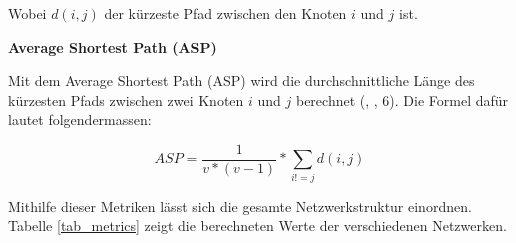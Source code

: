 Wobei $d(i,j)$ der kürzeste Pfad zwischen den Knoten $i$ und $j$ ist.

\textbf{Average Shortest Path (ASP)}

Mit dem Average Shortest Path (ASP) wird die durchschnittliche Länge des kürzesten Pfads zwischen zwei Knoten $i$ und $j$ berechnet (\citeauthor{gao_link_2015}, \citeyear{gao_link_2015}, 6).
Die Formel dafür lautet folgendermassen:

\begin{equation}
    \label{eq:asp}
    ASP = \frac{1}{v * (v - 1)} * \sum\limits_{i!=j} d(i,j)
\end{equation}

Mithilfe dieser Metriken lässt sich die gesamte Netzwerkstruktur einordnen.
Tabelle \ref{tab_metrics} zeigt die berechneten Werte der verschiedenen Netzwerken.

\begin{table}[h]
    \centering
    \caption{Metrikwerte der Netzwerke}
    \label{tab_metrics}
\end{table}
